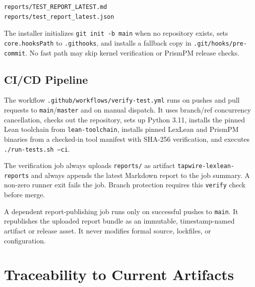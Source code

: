 \documentclass[11pt]{article}
\begin{document}
\begin{lstlisting}
reports/TEST_REPORT_LATEST.md
reports/test_report_latest.json
\end{lstlisting}

The installer initializes \texttt{git init -b main} when no repository exists, sets
\texttt{core.hooksPath} to \texttt{.githooks}, and installs a fallback copy in
\texttt{.git/hooks/pre-commit}. No fast path may skip kernel verification or PrismPM release
checks.

\subsection{CI/CD Pipeline}

The workflow \texttt{.github/workflows/verify-test.yml} runs on pushes and pull requests to
\texttt{main}/\texttt{master} and on manual dispatch. It uses branch/ref concurrency cancellation,
checks out the repository, sets up Python 3.11, installs the pinned Lean toolchain from
\texttt{lean-toolchain}, installs pinned LexLean and PrismPM binaries from a checked-in tool manifest
with SHA-256 verification, and executes \texttt{./run-tests.sh --ci}.

The verification job always uploads \texttt{reports/} as artifact
\texttt{tapwire-lexlean-reports} and always appends the latest Markdown report to the job summary.
A non-zero runner exit fails the job. Branch protection requires this \texttt{verify} check before
merge.

A dependent report-publishing job runs only on successful pushes to \texttt{main}. It republishes the
uploaded report bundle as an immutable, timestamp-named artifact or release asset. It never modifies
formal source, lockfiles, or configuration.

\section{Traceability to Current Artifacts}
\end{document}
